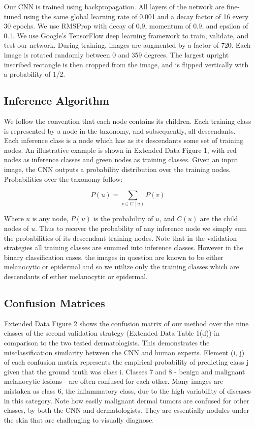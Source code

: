 Our CNN is trained using backpropagation. All layers of the network are fine-tuned using the same global learning rate of 0.001 and a decay factor of 16 every 30 epochs. We use RMSProp with decay of 0.9, momentum of 0.9, and epsilon of 0.1. We use Google’s TensorFlow \cite{abadi2016tensorflow} deep learning framework to train, validate, and test our network. During training, images are augmented by a factor of 720. Each image is rotated randomly between 0 and 359 degrees. The largest upright inscribed rectangle is then cropped from the image, and is flipped vertically with a probability of 1/2. 

\subsection{Inference Algorithm}
We follow the convention that each node contains its children. Each training class is represented by a node in the taxonomy, and subsequently, all descendants. Each inference class is a node which has as its descendants some set of training nodes. An illustrative example is shown in Extended Data Figure 1, with red nodes as inference classes and green nodes as training classes. Given an input image, the CNN outputs a probability distribution over the training nodes. Probabilities over the taxonomy follow:

$$P(u) = \sum_{v \in C(u)}{P(v)}$$

Where $u$ is any node, $P(u)$ is the probability of $u$, and $C(u)$ are the child nodes of $u$. Thus to recover the probability of any inference node we simply sum the probabilities of its descendant training nodes. Note that in the validation strategies all training classes are summed into inference classes. However in the binary classification cases, the images in question are known to be either melanocytic or epidermal and so we utilize only the training classes which are descendants of either melanocytic or epidermal.

\subsection{Confusion Matrices}
Extended Data Figure 2 shows the confusion matrix of our method over the nine classes of the second validation strategy (Extended Data Table 1(d)) in comparison to the two tested dermatologists. This demonstrates the misclassification similarity between the CNN and human experts. Element (i, j) of each confusion matrix represents the empirical probability of predicting class j given that the ground truth was class i. Classes 7 and 8 - benign and malignant melanocytic lesions - are often confused for each other. Many images are mistaken as class 6, the inflammatory class, due to the high variability of diseases in this category. Note how easily malignant dermal tumors are confused for other classes, by both the CNN and dermatologists. They are essentially nodules under the skin that are challenging to visually diagnose. 

